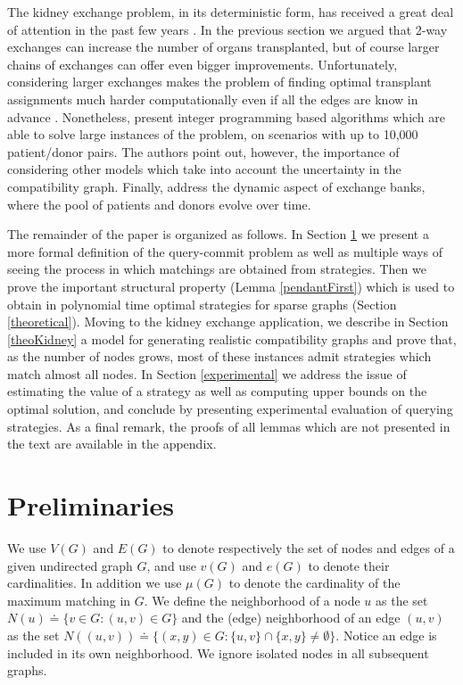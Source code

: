 \documentclass[12pt]{article}
\begin{document}
		The kidney exchange problem, in its deterministic form, has received a great deal of attention in the past few years \cite{david, roth3, roth1, roth2, segev}. In the previous section we argued that 2-way exchanges can increase the number of organs transplanted, but of course larger chains of exchanges can offer even bigger improvements. Unfortunately, considering larger exchanges makes the problem of finding optimal transplant assignments much harder computationally even if all the edges are know in advance \cite{david}. Nonetheless, \cite{david} present integer programming based algorithms which are able to solve large instances of the problem, on scenarios with up to 10,000 patient/donor pairs. The authors point out, however, the importance of considering other models which take into account the uncertainty in the compatibility graph. Finally, \cite{sandholm,unverDynamic,zenios} address the dynamic aspect of exchange banks, where the pool of patients and donors evolve over time. 
		
	The remainder of the paper is organized as follows. In Section \ref{prelim}	we present a more formal definition of the query-commit problem as well as multiple ways of seeing the process in which matchings are obtained from strategies. Then we prove the important structural property (Lemma \ref{pendantFirst}) which is used to obtain in polynomial time optimal strategies for sparse graphs (Section \ref{theoretical}). Moving to the kidney exchange application, we describe in Section \ref{theoKidney} a model for generating realistic compatibility graphs and prove that, as the number of nodes grows, most of these instances admit strategies which match almost all nodes. In Section \ref{experimental} we address the issue of estimating the value of a strategy as well as computing upper bounds on the optimal solution, and conclude by presenting experimental evaluation of querying strategies. As a final remark, the proofs of all lemmas which are not presented in the text are available in the appendix. 
	
	\section{Preliminaries} \label{prelim}

	We use $V(G)$ and $E(G)$ to denote respectively the set of nodes and edges of a given undirected graph $G$, and use $v(G)$ and $e(G)$ to denote their cardinalities. In addition we use $\mu(G)$ to denote the cardinality of the maximum matching in $G$. We define the neighborhood of a node $u$ as the set $N(u) \doteq \{v \in G : (u,v) \in G\}$ and the (edge) neighborhood of an edge $(u,v)$ as the set $N((u,v)) \doteq \{(x,y) \in G: \{u,v\} \cap \{x, y\} \neq \emptyset\}$. Notice an edge is included in its own neighborhood. We ignore isolated nodes in all subsequent graphs. 
	
\end{document}
